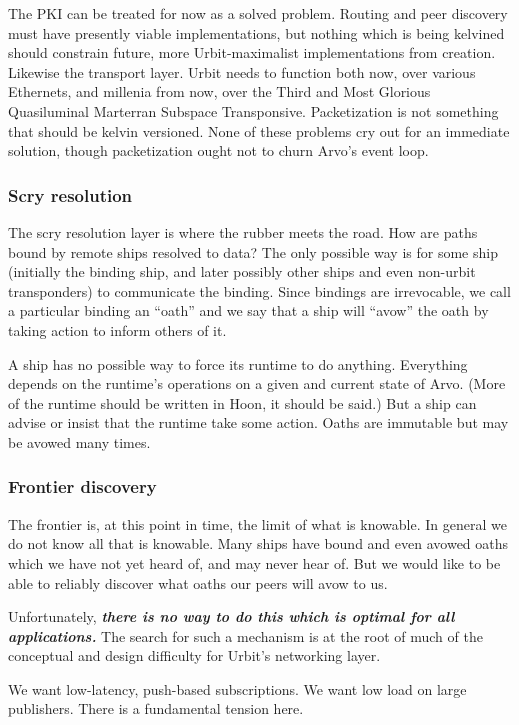The PKI can be treated for now as a solved problem. Routing and peer
discovery must have presently viable implementations, but nothing which
is being kelvined should constrain future, more Urbit-maximalist
implementations from creation. Likewise the transport layer. Urbit needs
to function both now, over various Ethernets, and millenia from now,
over the Third and Most Glorious Quasiluminal Marterran Subspace
Transponsive. Packetization is not something that should be kelvin
versioned. None of these problems cry out for an immediate solution,
though packetization ought not to churn Arvo's event loop.

\subsubsection{Scry resolution}

The scry resolution layer is where the rubber meets the road. How are
paths bound by remote ships resolved to data? The only possible way is
for some ship (initially the binding ship, and later possibly other
ships and even non-urbit transponders) to communicate the binding. Since
bindings are irrevocable, we call a particular binding an ``oath'' and
we say that a ship will ``avow'' the oath by taking action to inform
others of it.

A ship has no possible way to force its runtime to do anything.
Everything depends on the runtime's operations on a given and current
state of Arvo. (More of the runtime should be written in Hoon, it should
be said.) But a ship can advise or insist that the runtime take some
action. Oaths are immutable but may be avowed many times.

\subsubsection{Frontier discovery}

The frontier is, at this point in time, the limit of what is knowable.
In general we do not know all that is knowable. Many ships have bound
and even avowed oaths which we have not yet heard of, and may never hear
of. But we would like to be able to reliably discover what oaths our
peers will avow to us.

Unfortunately, \textbf{\emph{there is no way to do this which is optimal
for all applications.}} The search for such a mechanism is at the root
of much of the conceptual and design difficulty for Urbit's networking
layer.

We want low-latency, push-based subscriptions. We want low load on large
publishers. There is a fundamental tension here.

